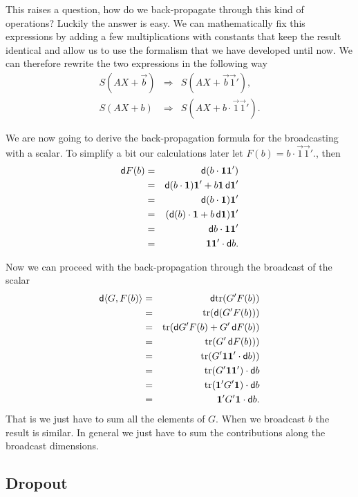 \documentclass{sapthesis}
\begin{document}
This raises a question, how do we back-propagate through this kind of
operations? Luckily the answer is easy. We can mathematically fix this
expressions by adding a few multiplications with constants that keep the result
identical and allow us to use the formalism that we have developed until now.
We can therefore rewrite the two expressions in the following way
\begin{eqnarray*}
    S(AX + \vec b) &\Rightarrow& S(AX + \vec b \vec 1'), \\
    S(AX + b)      &\Rightarrow& S(AX + b \cdot \vec 1 \vec 1').
\end{eqnarray*}

We are now going to derive the back-propagation formula for the broadcasting
with a scalar. To simplify a bit our calculations later let  \(F(b) = b \cdot \vec
1 \vec 1'.\), then
\begin{eqnarray*}
    \dif F(b)
    &=& \dif(b \cdot \vec 1 \vec 1') \\
    &=& \dif(b \cdot \vec 1) \vec 1' + b \vec 1 \dif \vec 1' \\
    &=& \dif(b \cdot \vec 1) \vec 1' \\
    &=& (\dif(b) \cdot \vec 1 + b \dif \vec 1) \vec 1' \\
    &=& \dif b \cdot \vec 1  \vec 1' \\
    &=& \vec 1 \vec 1' \cdot \dif b.
\end{eqnarray*}

Now we can proceed with the back-propagation through the broadcast of the scalar
\begin{eqnarray*}
    \dif\langle G,F(b)\rangle
    &=& \dif\trace(G' F(b)) \\
    &=& \trace(\dif(G' F(b))) \\
    &=& \trace(\dif G' F(b) + G' \dif F(b)) \\
    &=& \trace(G' \dif F(b))) \\
    &=& \trace(G' \vec 1 \vec 1' \cdot \dif b)) \\
    &=& \trace(G' \vec 1 \vec 1') \cdot \dif b \\
    &=& \trace(\vec 1' G' \vec 1) \cdot \dif b \\
    &=& \vec 1' G' \vec 1 \cdot \dif b.
\end{eqnarray*}
That is we just have to sum all the elements of \(G\). When we broadcast \(b\)
the result is similar. In general we just have to sum the contributions along
the broadcast dimensions.

\subsection{Dropout}
\end{document}
